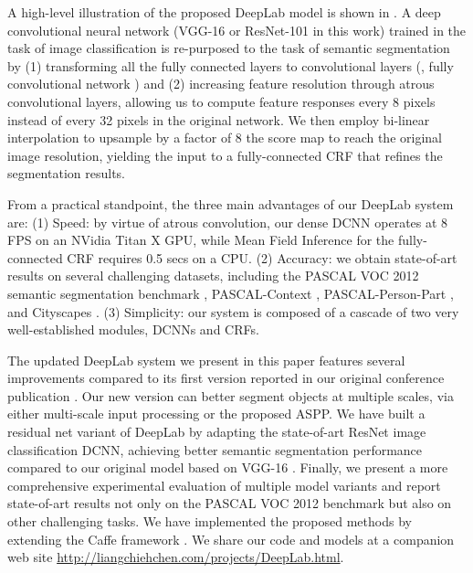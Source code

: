 A high-level illustration of the proposed DeepLab model is shown in
. A deep convolutional neural network
(VGG-16 \cite{simonyan2014very} or ResNet-101 \cite{he2015deep} in this work)
trained in the task of image classification is re-purposed to the task of
semantic segmentation by (1) transforming all the fully connected layers
to convolutional layers (\ie, fully convolutional network \cite{long2014fully})
and (2) increasing feature resolution through
atrous convolutional layers, allowing us  to compute feature
responses  every 8 pixels instead of every 32 pixels in the original network. 
We then employ bi-linear interpolation to upsample by a
factor of 8 the score map to reach the original image resolution, yielding the 
input to 
a fully-connected CRF \cite{krahenbuhl2011efficient} that refines the
segmentation results.

From a practical standpoint, the three main advantages of our DeepLab
system are: (1) Speed: by virtue of atrous convolution, our dense DCNN operates
at 8 FPS on an NVidia Titan X GPU, while Mean Field Inference for the
fully-connected CRF requires 0.5 secs on a CPU. (2) Accuracy: we obtain
state-of-art results on several challenging datasets, including the PASCAL VOC 2012
semantic segmentation benchmark \cite{everingham2014pascal}, PASCAL-Context
\cite{mottaghi2014role}, PASCAL-Person-Part \cite{chen_cvpr14}, and Cityscapes
\cite{Cordts2016Cityscapes}. (3) Simplicity: our system is composed of a cascade of
two very well-established modules, DCNNs and CRFs.

The updated DeepLab system we present in this paper features several
improvements compared to its first version reported in our original conference
publication \cite{chen2014semantic}. Our new version can better segment objects
at multiple scales, via either multi-scale input processing \cite{farabet2013learning, lin2015efficient, chen2015attention} or the 
proposed ASPP. We have built a residual net variant of DeepLab by adapting
the state-of-art ResNet \cite{he2015deep} image classification DCNN, achieving
better semantic segmentation performance compared to our original model based on
VGG-16 \cite{simonyan2014very}. Finally, we present a more comprehensive
experimental evaluation of multiple model variants and report state-of-art
results not only on the PASCAL VOC 2012 benchmark but also on other challenging
tasks. We have implemented the proposed methods by extending
the Caffe framework \cite{jia2014caffe}. We share our code and models at a
companion web site \url{http://liangchiehchen.com/projects/DeepLab.html}.



